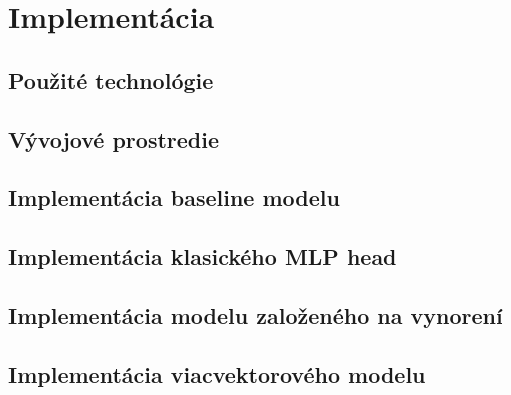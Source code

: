 \chapter{Implementácia}

\label{kap:implementacia}

\section{Použité technológie}

\section{Vývojové prostredie}

\section{Implementácia baseline modelu}

\section{Implementácia klasického MLP head}

\section{Implementácia modelu založeného na vynorení}

\section{Implementácia viacvektorového modelu}